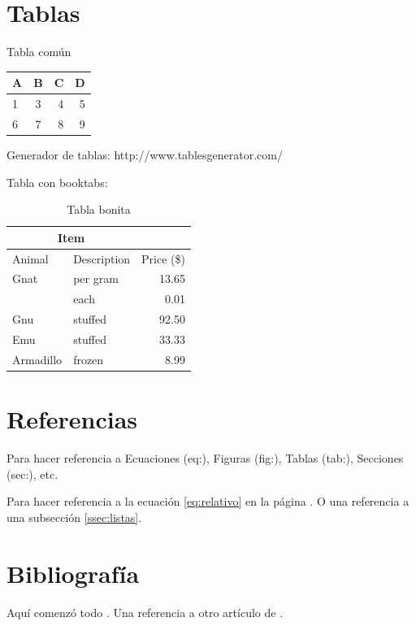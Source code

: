 \section{Tablas}

Tabla común

\begin{tabular}{|l|c|rr|}
	\hline
	A & B & C & D\\
	\hline
	1 & 3 & 4 & 5\\
	6 & 7 & 8 & 9\\
	\hline
\end{tabular}

Generador de tablas: http://www.tablesgenerator.com/

Tabla con booktabs:

\begin{table}[H]
	\centering
	\begin{tabular}{llr}
		\toprule
		\multicolumn{2}{c}{Item} &            \\ \midrule
		Animal     & Description & Price (\$) \\ \midrule
		Gnat       & per gram    & 13.65      \\
		& each        & 0.01       \\
		Gnu        & stuffed     & 92.50      \\
		Emu        & stuffed     & 33.33      \\
		Armadillo  & frozen      & 8.99       \\ \bottomrule
	\end{tabular}
	\caption{Tabla bonita}
	\label{tab:tabbonita}
\end{table}

\section{Referencias}

Para hacer referencia a Ecuaciones (eq:), Figuras (fig:), Tablas (tab:), Secciones (sec:), etc.

Para hacer referencia a la ecuación \ref{eq:relativo} en la página \pageref{eq:relativo}. O una referencia a una subsección \ref{ssec:listas}.

\section{Bibliografía}

Aquí comenzó todo \citep{turing1937}. Una referencia a otro artículo de \citet{cook1971}.

